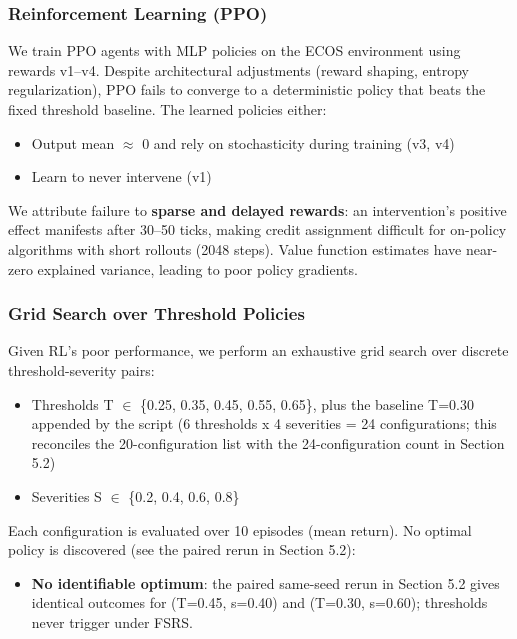 \documentclass[11pt]{article}
\begin{document}
\subsubsection{Reinforcement Learning (PPO)}
We train PPO agents with MLP policies on the ECOS environment using rewards v1--v4. Despite architectural adjustments (reward shaping, entropy regularization), PPO fails to converge to a deterministic policy that beats the fixed threshold baseline. The learned policies either:

\begin{itemize}
\item Output mean $\approx$ 0 and rely on stochasticity during training (v3, v4)
\item Learn to never intervene (v1)
\end{itemize}

We attribute failure to \textbf{sparse and delayed rewards}: an intervention's positive effect manifests after 30--50 ticks, making credit assignment difficult for on-policy algorithms with short rollouts (2048 steps). Value function estimates have near-zero explained variance, leading to poor policy gradients.

\subsubsection{Grid Search over Threshold Policies}
Given RL's poor performance, we perform an exhaustive grid search over discrete threshold-severity pairs:

\begin{itemize}
\item Thresholds T $\in$ \{0.25, 0.35, 0.45, 0.55, 0.65\}, plus the baseline T=0.30 appended by the script (6 thresholds x 4 severities = 24 configurations; this reconciles the 20-configuration list with the 24-configuration count in Section 5.2)
\item Severities S $\in$ \{0.2, 0.4, 0.6, 0.8\}
\end{itemize}

Each configuration is evaluated over 10 episodes (mean return). No optimal policy is discovered (see the paired rerun in Section 5.2):

\begin{itemize}
\item \textbf{No identifiable optimum}: the paired same-seed rerun in Section 5.2 gives identical outcomes for (T=0.45, s=0.40) and (T=0.30, s=0.60); thresholds never trigger under FSRS.
\end{itemize}
\end{document}
